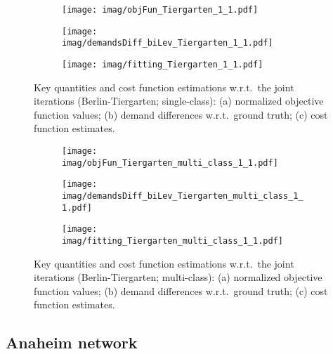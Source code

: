 \documentclass[3p]{elsarticle}
\begin{document}
	
\begin{figure}[H]  
	\centering
	\begin{subfigure}[b]{0.8\textwidth}
		\texttt{[image: imag/objFun\_Tiergarten\_1\_1.pdf]}
		\caption{}
		\label{fig:uni_objFun_Tiergarten}
	\end{subfigure} 
	\begin{subfigure}[b]{0.8\textwidth}
		\texttt{[image: imag/demandsDiff\_biLev\_Tiergarten\_1\_1.pdf]}
		\caption{}
		\label{fig:uni_demandsDiff_biLev_Tiergarten}
	\end{subfigure}   
	\begin{subfigure}[b]{0.8\textwidth}
		\texttt{[image: imag/fitting\_Tiergarten\_1\_1.pdf]}
		\caption{}
		\label{fig:uni_CostTiergarten}
	\end{subfigure}   
	\caption{Key quantities and cost function estimations w.r.t.\
          the joint iterations (Berlin-Tiergarten; single-class): (a)
          normalized objective function values; (b) demand differences
          w.r.t.\ ground truth; (c) cost function estimates.}
	\label{fig:uni_Tiergarten}
\end{figure}

\begin{figure}[H]  
	\centering
	\begin{subfigure}[b]{0.8\textwidth}
		\texttt{[image: imag/objFun\_Tiergarten\_multi\_class\_1\_1.pdf]}
		\caption{}
		\label{objFun_Tiergarten}
	\end{subfigure} 
	\begin{subfigure}[b]{0.8\textwidth}
		\texttt{[image: imag/demandsDiff\_biLev\_Tiergarten\_multi\_class\_1\_1.pdf]}
		\caption{}
		\label{demandsDiff_biLev_Tiergarten}
	\end{subfigure}   
	\begin{subfigure}[b]{0.8\textwidth}
		\texttt{[image: imag/fitting\_Tiergarten\_multi\_class\_1\_1.pdf]}
		\caption{}
		\label{fig:CostTiergarten}
	\end{subfigure}   
	\caption{Key quantities and cost function estimations w.r.t.\
          the joint iterations (Berlin-Tiergarten; multi-class): (a)
          normalized objective function values; (b) demand differences
          w.r.t.\ ground truth; (c) cost function estimates.}
	\label{fig:Tiergarten}
\end{figure}

	
\subsection{Anaheim network}
\end{document}
